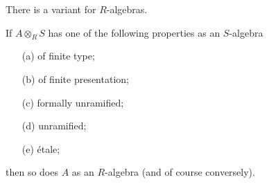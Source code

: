 \noindent
There is a variant for $R$-algebras.

\begin{theorem}
\label{theorem-descend-algebra-properties}
If $A \otimes_R S$ has one of the following properties as an $S$-algebra
\begin{enumerate}
\item[(a)]
of finite type;
\item[(b)]
of finite presentation;
\item[(c)]
formally unramified;
\item[(d)]
unramified;
\item[(e)]
\'etale;
\end{enumerate}
then so does $A$ as an $R$-algebra (and of course conversely).
\end{theorem}

